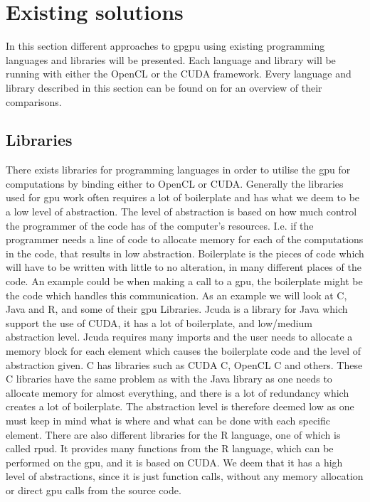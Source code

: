 \section{Existing solutions} %
\label{sec:state_of_the_art}
In this section different approaches to \acrshort{gpgpu} using existing programming languages and libraries will be presented.
Each language and library will be running with either the OpenCL or the CUDA framework.
Every language and library described in this section can be found on  for an overview of their comparisons.
      
\subsection{Libraries} 
There exists libraries for programming languages in order to utilise the \acrshort{gpu} for computations by binding either to OpenCL or CUDA.
Generally the libraries used for \acrshort{gpu} work often requires a lot of boilerplate and has what we deem to be a low level of abstraction.
The level of abstraction is based on how much control the programmer of the code has of the computer's resources.
I.e. if the programmer needs a line of code to allocate memory for each of the computations in the code, that results in low abstraction.
Boilerplate is the pieces of code which will have to be written with little to no alteration, in many different places of the code.
An example could be when making a call to a \acrshort{gpu}, the boilerplate might be the code which handles this communication.
As an example we will look at C, Java and R, and some of their \acrshort{gpu} Libraries.
Jcuda is a library for Java which support the use of CUDA, it has a lot of boilerplate, and low/medium abstraction level. \citep{Java_library}
Jcuda requires many imports and the user needs to allocate a memory block for each element which causes the boilerplate code and the level of abstraction given. \citep{Java_malloc}
C has libraries such as CUDA C, OpenCL C and others.
These C libraries have the same problem as with the Java library as one needs to allocate memory for almost everything, and there is a lot of redundancy which creates a lot of boilerplate.
The abstraction level is therefore deemed low as one must keep in mind what is where and what can be done with each specific element. \citep{C_CUDA} 
There are also different libraries for the R language, one of which is called rpud.
It provides many functions from the R language, which can be performed on the \acrshort{gpu}, and it is based on CUDA.
We deem that it has a high level of abstractions, since it is just function calls, without any memory allocation or direct \acrshort{gpu} calls from the source code. \citep{Rcuda} 

